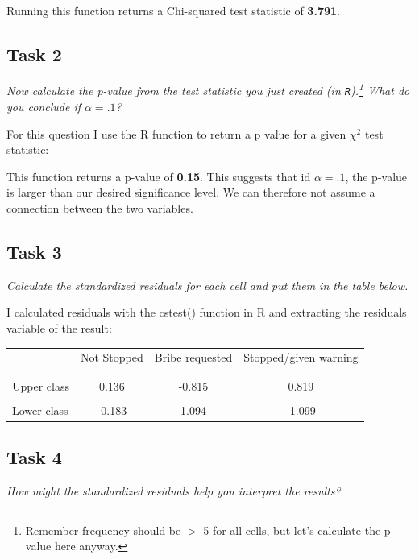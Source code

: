 \documentclass[12pt,a4paper]{article}
\begin{document}
  

\noindent Running this function returns a Chi-squared test statistic of \textbf{3.791}.

\subsection*{Task 2}
\textit{Now calculate the p-value from the test statistic you just created (in \texttt{R}).\footnote{Remember frequency should be $>$ 5 for all cells, but let's calculate the p-value here anyway.}  What do you conclude if $\alpha = .1$?\\}

For this question I use the R function to return a p value for a given $\chi^2$ test statistic:



\noindent This function returns a p-value of \textbf{0.15}. This suggests that id $\alpha = .1$, the p-value is larger than our desired significance level. We can therefore not assume a connection between the two variables.

\subsection*{Task 3}
\textit{Calculate the standardized residuals for each cell and put them in the table below.}

I calculated residuals with the cstest() function in R and extracting the residuals variable of the result:



\begin{table}[h]
	\centering
	\begin{tabular}{l | c c c }
		& Not Stopped & Bribe requested & Stopped/given warning \\
		\\[-1.8ex] 
		\hline \\[-1.8ex]
		Upper class  & 0.136 & -0.815 & 0.819 \\
		\\
		Lower class & -0.183 & 1.094 & -1.099 \\
	\end{tabular}
\end{table}

\subsection*{Task 4}
\textit{How might the standardized residuals help you interpret the results?}
\end{document}
